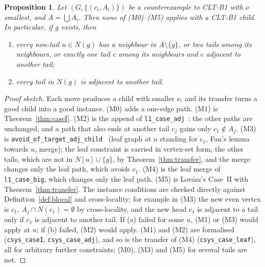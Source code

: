 \documentclass[11pt]{amsart}
\newtheorem{proposition}[theorem]{Proposition}
\theoremstyle{definition}
\begin{document}
\begin{proposition}\label{prop:residual}
Let $(G,\{(c_i,A_i)\})$ be a counterexample to CLT-B1 with $\nu$ smallest, and $A=\bigcup A_i$.
Then none of (M0)--(M5) applies with a CLT-B1 child. In particular, if $g$ exists, then
\begin{enumerate}[label=(\alph*)]
\item every non-tail $u\in N(g)$ has a neighbour in $A\setminus\{g\}$, or two tails among its
neighbours, or exactly one tail $c$ among its neighbours and $c$ adjacent to another tail;
\item every tail in $N(g)$ is adjacent to another tail.
\end{enumerate}
\end{proposition}

\begin{proof}[Proof sketch]
Each move produces a child with smaller $\nu$, and its transfer turns a good child into a good
instance. (M0) adds a one-edge path. (M1) is Theorem~\ref{thm:caseI}. (M2) is the append of
\texttt{l1\_case\_adj}~\cite{L1S}: the other paths are unchanged, and a path that also ends at another
tail $c_j$ gains only $c_1\notin A_j$. (M3) is \texttt{avoid\_of\_target\_adj\_child}~\cite{L1I}
(leaf graph at $u$ standing for $c_1$, Fan's lemma towards $u$, merge); the leaf constraint is carried
in vertex-set form, the other tails, which are not in $N[u]\cup\{g\}$, by
Theorem~\ref{thm:transfer}, and the merge changes only the leaf path, which avoids $c_1$. (M4) is the
leaf merge of \texttt{l1\_case\_big}, which changes only the leaf path. (M5) is Lov\'asz's Case~II
with Theorem~\ref{thm:transfer}. The instance conditions are checked directly against
Definition~\ref{def:blocal} and cross-locality; for example in (M3) the new even vertex is $c_1$,
$A_j\cap N(c_1)=\emptyset$ by cross-locality, and the new head $c_1$ is adjacent to a tail only if
$c_1$ is adjacent to another tail. If (a) failed for some $u$, (M1) or (M3) would apply at $u$; if
(b) failed, (M2) would apply. (M1) and (M2) are formalised (\texttt{csys\_caseI},
\texttt{csys\_case\_adj}), and so is the transfer of (M4) (\texttt{csys\_case\_leaf}), all for
arbitrary further constraints; (M0), (M3) and (M5) for several tails are not.
\end{proof}
\end{document}
